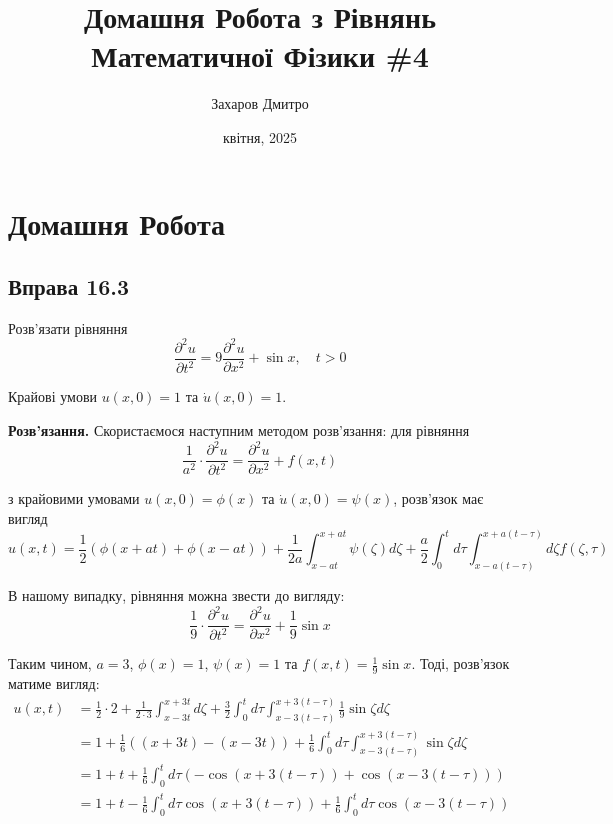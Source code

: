 \documentclass{hw_template}
\title{\huge\sffamily\bfseries Домашня Робота з Рівнянь Математичної Фізики \#4}
\author{\Large\sffamily Захаров Дмитро}
\date{\sffamily 26 квітня, 2025}
\begin{document}
\pagestyle{fancy}

\maketitle

\tableofcontents

\pagebreak

\section{Домашня Робота}

\subsection{Вправа 16.3}

\begin{problem}
    Розв'язати рівняння
    \begin{equation*}
        \frac{\partial^2 u}{\partial t^2} = 9 \frac{\partial^2 u}{\partial x^2} + \sin x, \quad t > 0
    \end{equation*}

    Крайові умови $u(x,0)=1$ та $\dot{u}(x,0)=1$.
\end{problem}

\textbf{Розв'язання.} Скористаємося наступним методом розв'язання: для рівняння
\begin{equation*}
    \frac{1}{a^2}\cdot \frac{\partial^2 u}{\partial t^2} = \frac{\partial^2 u}{\partial x^2} + f(x,t)
\end{equation*}

з крайовими умовами $u(x,0)=\phi(x)$ та $\dot{u}(x,0)=\psi(x)$, розв'язок має вигляд
\begin{equation*}
    u(x,t) = \frac{1}{2} \left( \phi(x+at) + \phi(x-at) \right) + \frac{1}{2a} \int_{x-at}^{x+at} \psi(\zeta) d\zeta + \frac{a}{2}\int_0^t d\tau \int_{x-a(t-\tau)}^{x+a(t-\tau)} d\zeta f(\zeta,\tau)
\end{equation*}

В нашому випадку, рівняння можна звести до вигляду:
\begin{equation*}
    \frac{1}{9} \cdot \frac{\partial^2 u}{\partial t^2} = \frac{\partial^2 u}{\partial x^2} + \frac{1}{9} \sin x
\end{equation*}

Таким чином, $a=3$, $\phi(x)=1$, $\psi(x)=1$ та $f(x,t)=\frac{1}{9}\sin x$. Тоді, розв'язок матиме вигляд:
\begin{align*}
    u(x,t) &= \frac{1}{2} \cdot 2 + \frac{1}{2 \cdot 3}\int_{x-3t}^{x+3t} d\zeta + \frac{3}{2}\int_0^t d\tau \int_{x-3(t-\tau)}^{x+3(t-\tau)}\frac{1}{9}\sin \zeta d\zeta \\
    &= 1 + \frac{1}{6} \left( (x+3t) - (x-3t) \right) + \frac{1}{6}\int_0^t d\tau \int_{x-3(t-\tau)}^{x+3(t-\tau)}\sin \zeta d\zeta \\
    &= 1 + t + \frac{1}{6}\int_0^t d\tau \left( -\cos(x+3(t-\tau)) + \cos(x-3(t-\tau)) \right) \\
    &= 1 + t - \frac{1}{6}\int_0^t d\tau \cos(x+3(t-\tau)) + \frac{1}{6}\int_0^t d\tau \cos(x-3(t-\tau)) 
\end{align*}
\end{document}
